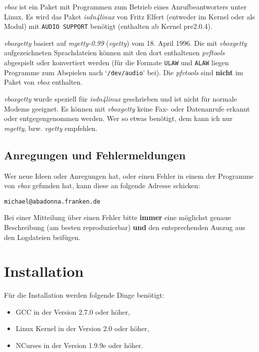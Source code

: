 {\em vbox\/} ist ein Paket mit Programmen zum Betrieb eines
Anrufbeantworters unter Linux. Es wird das Paket {\em isdn4linux\/} von
Fritz Elfert (entweder im Kernel oder als Modul) mit {\tt AUDIO SUPPORT}
ben\"{o}tigt (enthalten ab Kernel pre2.0.4).

{\em vboxgetty\/} basiert auf {\em mgetty-0.99\/} ({\em vgetty\/}) vom
18. April 1996. Die mit {\em vboxgetty\/} aufgezeichneten Sprachdateien
k\"{o}nnen mit den dort enthaltenen {\em pvftools\/} abgespielt oder
konvertiert werden (f\"{u}r die Formate {\tt ULAW} und {\tt ALAW} liegen
Programme zum Abspielen nach `{\tt /dev/audio}' bei). Die
{\em pfvtools\/} sind {\bf nicht} im Paket von {\em vbox\/} enthalten.

{\em vboxgetty\/} wurde speziell f\"{u}r {\em isdn4linux\/} geschrieben und
ist nicht f\"{u}r normale Modems geeignet. Es k\"{o}nnen mit {\em vboxgetty\/}
keine Fax- oder Datenanrufe erkannt oder entgegengenommen werden. Wer so
etwas ben\"{o}tigt, dem kann ich nur {\em mgetty\/}, bzw. {\em vgetty\/}
empfehlen.






\subsection{Anregungen und Fehlermeldungen\label{id-vorwort-report}}



Wer neue Ideen oder Anregungen hat, oder einen Fehler in einem der Programme
von {\em vbox\/} gefunden hat, kann diese an folgende Adresse schicken:

{\tt michael@abadonna.franken.de}

Bei einer Mitteilung \"{u}ber einen Fehler bitte {\bf immer} eine m\"{o}glichst
genaue Beschreibung (am besten reproduzierbar) {\bf und} den
entsprechenden Auszug aus den Logdateien beif\"{u}gen.






\section{Installation\label{id-install}}



F\"{u}r die Installation werden folgende Dinge ben\"{o}tigt:

\begin{itemize}
\item GCC in der Version 2.7.0 oder h\"{o}her,
\item Linux Kernel in der Version 2.0 oder h\"{o}her,
\item NCurses in der Version 1.9.9e oder h\"{o}her.
\end{itemize}


